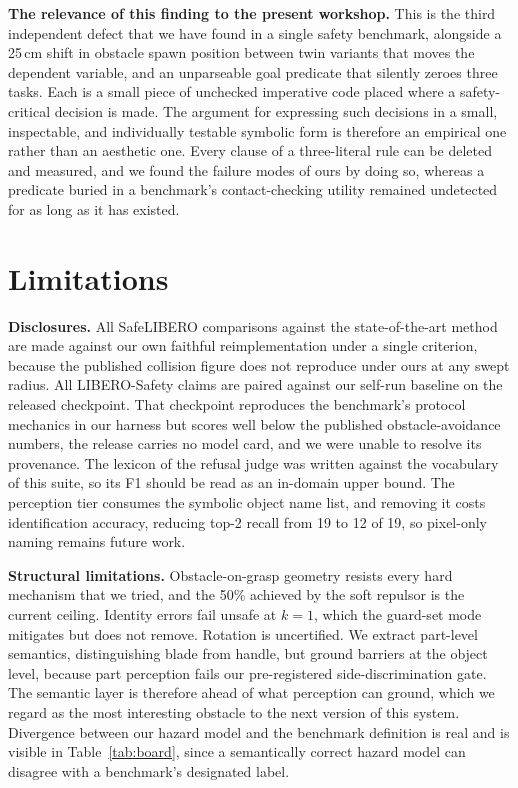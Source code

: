 \documentclass[conference]{IEEEtran}
\begin{document}
\textbf{The relevance of this finding to the present workshop.} This is the third independent defect that we have found in a single safety benchmark, alongside a 25\,cm shift in obstacle spawn position between twin variants that moves the dependent variable, and an unparseable goal predicate that silently zeroes three tasks. Each is a small piece of unchecked imperative code placed where a safety-critical decision is made. The argument for expressing such decisions in a small, inspectable, and individually testable symbolic form is therefore an empirical one rather than an aesthetic one. Every clause of a three-literal rule can be deleted and measured, and we found the failure modes of ours by doing so, whereas a predicate buried in a benchmark's contact-checking utility remained undetected for as long as it has existed.

\section{Limitations}
\label{sec:limitations}

\textbf{Disclosures.} All SafeLIBERO comparisons against the state-of-the-art method are made against our own faithful reimplementation under a single criterion, because the published collision figure does not reproduce under ours at any swept radius. All LIBERO-Safety claims are paired against our self-run baseline on the released checkpoint. That checkpoint reproduces the benchmark's protocol mechanics in our harness but scores well below the published obstacle-avoidance numbers, the release carries no model card, and we were unable to resolve its provenance. The lexicon of the refusal judge was written against the vocabulary of this suite, so its F1 should be read as an in-domain upper bound. The perception tier consumes the symbolic object name list, and removing it costs identification accuracy, reducing top-2 recall from 19 to 12 of 19, so pixel-only naming remains future work.

\textbf{Structural limitations.} Obstacle-on-grasp geometry resists every hard mechanism that we tried, and the 50\% achieved by the soft repulsor is the current ceiling. Identity errors fail unsafe at $k{=}1$, which the guard-set mode mitigates but does not remove. Rotation is uncertified. We extract part-level semantics, distinguishing blade from handle, but ground barriers at the object level, because part perception fails our pre-registered side-discrimination gate. The semantic layer is therefore ahead of what perception can ground, which we regard as the most interesting obstacle to the next version of this system. Divergence between our hazard model and the benchmark definition is real and is visible in Table~\ref{tab:board}, since a semantically correct hazard model can disagree with a benchmark's designated label.
\end{document}
